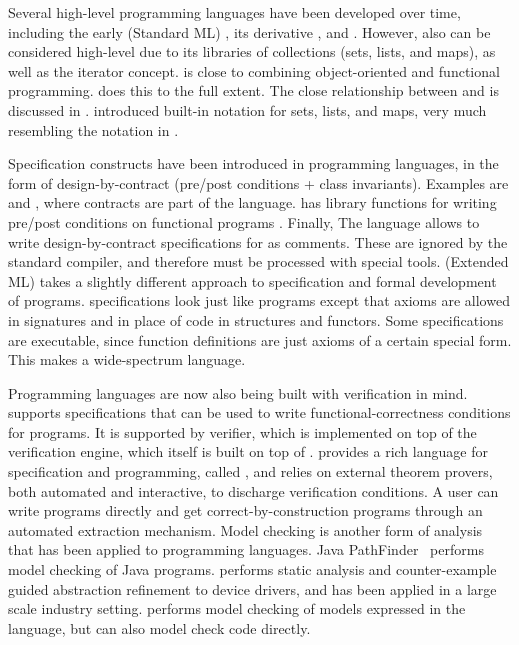 Several high-level programming languages have been developed over 
time, including the early \sml{} (Standard ML) \cite{standard-ml-97},
its derivative \ocaml{} \cite{ocaml}, and \haskell{}
\cite{haskell}. However, also \java{} can be considered high-level due
to its libraries of collections (sets, lists, and maps), as well as
the iterator concept. \python{} \cite{python} is close to combining
object-oriented and functional programming. \scala{} \cite{scala}
does this to the full extent. The close relationship between \scala{} 
and \vdm{} is discussed in \cite{havelund-scala-vdm-12}.
\fortress{} \cite{fortress} introduced built-in notation for sets, lists, and maps,
very much resembling the notation in \vdm{}.

Specification constructs have been introduced in programming
languages, in the form of design-by-contract (pre/post conditions +
class invariants). Examples are \eiffel{} \cite{eiffel} and
\specsharp{} \cite{specsharp}, where contracts are part of the
language. \scala{} has library functions for writing pre/post
conditions on functional programs \cite{odersky-rv10}. Finally, The
\jml{} language \cite{jml} allows to write design-by-contract
specifications for \java{} as comments. These are ignored by the
standard \java{} compiler, and therefore must be processed with
special tools. \eml{} (Extended ML) \cite{sannella-eml-97} takes a
slightly different approach to specification and formal development of
\sml{} programs.  \eml{} specifications look just like \sml{} programs
except that axioms are allowed in signatures and in place of code in
structures and functors. Some \eml{} specifications are executable,
since \sml{} function definitions are just axioms of a certain special
form. This makes \eml{} a wide-spectrum language.

Programming languages are now also being built with verification in mind.
\dafny{} \cite{leino-lpar-2010} supports specifications that can be used to write functional-correctness conditions for programs.  It is supported by verifier, which is implemented on top of the \boogie{} verification engine, which itself is built on top of \zthree. 
\whythree{} \cite{filliatre-why3-2011} provides a rich language for specification and programming, called \whyml{}, and relies on external theorem provers, both automated and interactive, to discharge verification conditions. A user can write \whyml{} programs directly and get correct-by-construction \ocaml{} programs through an automated extraction mechanism. Model checking is another form of analysis that
has been applied to programming languages.
Java PathFinder~\cite{havelund-jpf-00,havelund-visser02} performs model
checking of Java programs. \slam{} \cite{ball2010slam2} performs
static analysis and counter-example guided abstraction refinement to
device drivers, and has been applied in a large scale industry setting. 
\spin{} \cite{holzmann-spin-2004} performs model checking of models
expressed in the \promela{} language, but can also model check \clang{} 
code directly.

